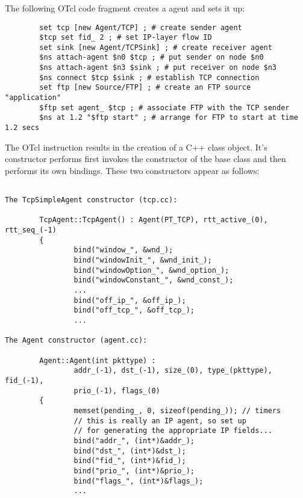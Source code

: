 \subsubsection{}

The following OTcl code fragment creates a  agent
and sets it up:
\begin{small}
\begin{verbatim}
        set tcp [new Agent/TCP] ; # create sender agent
        $tcp set fid_ 2 ; # set IP-layer flow ID
        set sink [new Agent/TCPSink] ; # create receiver agent
        $ns attach-agent $n0 $tcp ; # put sender on node $n0
        $ns attach-agent $n3 $sink ; # put receiver on node $n3
        $ns connect $tcp $sink ; # establish TCP connection
        set ftp [new Source/FTP] ; # create an FTP source "application"
        $ftp set agent_ $tcp ; # associate FTP with the TCP sender
        $ns at 1.2 "$ftp start" ; # arrange for FTP to start at time 1.2 secs
\end{verbatim}
\end{small}
The OTcl instruction  results in the
creation of a C++  class object.
It's constructor performs first invokes the constructor of the
 base class and then performs its own bindings.
These two constructors appear as follows:
\begin{small}
\begin{verbatim}

The TcpSimpleAgent constructor (tcp.cc):

        TcpAgent::TcpAgent() : Agent(PT_TCP), rtt_active_(0), rtt_seq_(-1)
        {
                bind("window_", &wnd_);
                bind("windowInit_", &wnd_init_);
                bind("windowOption_", &wnd_option_);
                bind("windowConstant_", &wnd_const_);
                ...
                bind("off_ip_", &off_ip_);
                bind("off_tcp_", &off_tcp_);
                ...

The Agent constructor (agent.cc):

        Agent::Agent(int pkttype) : 
                addr_(-1), dst_(-1), size_(0), type_(pkttype), fid_(-1),
                prio_(-1), flags_(0)
        {
                memset(pending_, 0, sizeof(pending_)); // timers
                // this is really an IP agent, so set up
                // for generating the appropriate IP fields...
                bind("addr_", (int*)&addr_);
                bind("dst_", (int*)&dst_);
                bind("fid_", (int*)&fid_);
                bind("prio_", (int*)&prio_);
                bind("flags_", (int*)&flags_);
                ...
\end{verbatim}
\end{small}
